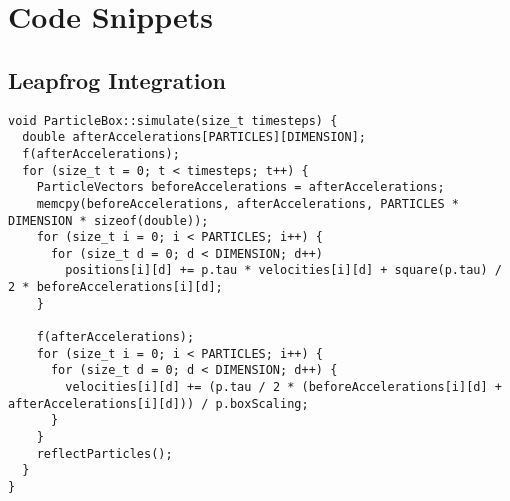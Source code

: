 
\chapter{Code Snippets}
\label{appendix:code-snippets}
\section{Leapfrog Integration}
\begin{verbatim}
void ParticleBox::simulate(size_t timesteps) {
  double afterAccelerations[PARTICLES][DIMENSION];
  f(afterAccelerations);
  for (size_t t = 0; t < timesteps; t++) {
    ParticleVectors beforeAccelerations = afterAccelerations;
    memcpy(beforeAccelerations, afterAccelerations, PARTICLES * DIMENSION * sizeof(double));
    for (size_t i = 0; i < PARTICLES; i++) {
      for (size_t d = 0; d < DIMENSION; d++)
        positions[i][d] += p.tau * velocities[i][d] + square(p.tau) / 2 * beforeAccelerations[i][d];
    }

    f(afterAccelerations);
    for (size_t i = 0; i < PARTICLES; i++) {
      for (size_t d = 0; d < DIMENSION; d++) {
        velocities[i][d] += (p.tau / 2 * (beforeAccelerations[i][d] + afterAccelerations[i][d])) / p.boxScaling;
      }
    }
    reflectParticles();
  }
}
\end{verbatim}
